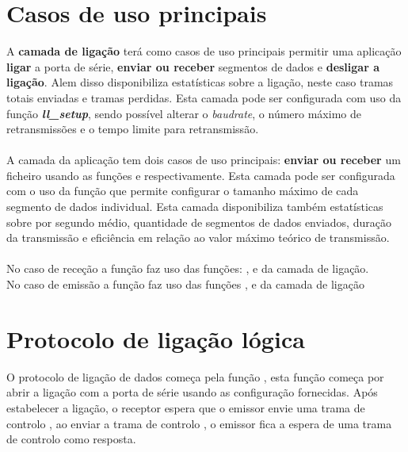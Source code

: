 \documentclass[11pt]{article}
\begin{document}
\newpage
\thispagestyle{fancy}
\fancyhf{}
\fancyfoot[R]{\thepage}
\renewcommand*{\footrulewidth}{1pt}

\section*{Casos de uso principais}
A \textbf{camada de ligação} terá como casos de uso principais permitir uma aplicação \textbf{ligar} a porta de série\textbf{}, \textbf{enviar ou receber} segmentos de dados\textbf{} e \textbf{desligar a ligação}\textbf{}. Alem disso disponibiliza estatísticas sobre a ligação, neste caso tramas totais enviadas e tramas perdidas. Esta camada pode ser configurada com uso da função \textbf{\emph{ll\_setup}}, sendo possível alterar o \emph{baudrate}, o número máximo de retransmissões e o tempo limite para retransmissão.
\\\\
A camada da aplicação tem dois casos de uso principais: \textbf{enviar ou receber} um ficheiro usando as funções \textbf{} e \textbf{} respectivamente. Esta camada pode ser configurada com o uso da função \textbf{} que permite configurar o tamanho máximo de cada segmento de dados individual. Esta camada disponibiliza também estatísticas sobre  por segundo médio, quantidade de segmentos de dados enviados, duração da transmissão e eficiência em relação ao valor máximo teórico de transmissão.
\\\\
No caso de receção a função \textbf{} faz uso das funções: \textbf{}, \textbf{} e \textbf{} da camada de ligação.\\
No caso de emissão a função \textbf{} faz uso das funções \textbf{}, \textbf{} e \textbf{} da camada de ligação


\section*{Protocolo de ligação lógica}
O protocolo de ligação de dados começa pela função \textbf{}, esta função começa por abrir a ligação com a porta de série usando as configuração fornecidas. Após estabelecer a ligação, o receptor espera que o emissor envie uma trama de controlo , ao enviar a trama de controlo , o emissor fica a espera de uma trama de controlo  como resposta.\\
\end{document}
